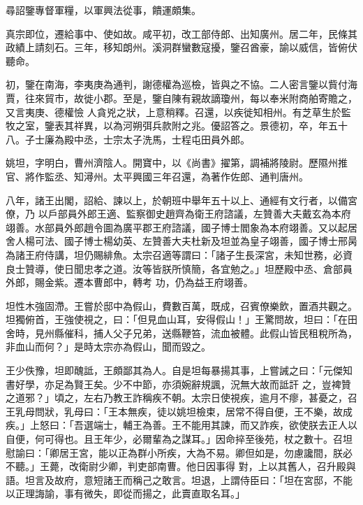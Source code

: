 \begin{pinyinscope}
 尋詔鑒專督軍糧，以軍興法從事，饋運頗集。



 真宗即位，遷給事中、使如故。咸平初，改工部侍郎、出知廣州。居二年，民條其政績上請刻石。三年，移知朗州。溪洞群蠻數寇擾，鑒召酋豪，諭以威信，皆俯伏聽命。



 初，鑒在南海，李夷庚為通判，謝德權為巡檢，皆與之不協。二人密言鑒以貲付海賈，往來貿市，故徙小郡。至是，鑒自陳有親故謫瓊州，每以奉米附商舶寄贍之，又言夷庚、德權憸
 人貪兇之狀，上意稍釋。召還，以疾徙知相州。有芝草生於監牧之室，鑒表其祥異，以為河朔弭兵款附之兆。優詔答之。景德初，卒，年五十八。子士廉為殿中丞，士宗太子洗馬，士程屯田員外郎。



 姚坦，字明白，曹州濟陰人。開寶中，以《尚書》擢第，調補將陵尉。歷隰州推官、將作監丞、知潯州。太平興國三年召還，為著作佐郎、通判唐州。



 八年，諸王出閣，詔給、諫以上，於朝班中舉年五十以上、通經有文行者，以備宮僚，乃
 以戶部員外郎王適、監察御史趙齊為衛王府諮議，左贊善大夫戴玄為本府翊善。水部員外郎趙令圖為廣平郡王府諮議，國子博士閻象為本府翊善。又以起居舍人楊可法、國子博士楊幼英、左贊善大夫杜新及坦並為皇子翊善，國子博士邢昺為諸王府侍講，坦仍賜緋魚。太宗召適等謂曰：「諸子生長深宮，未知世務，必資良士贊導，使日聞忠孝之道。汝等皆朕所慎簡，各宜勉之。」坦歷殿中丞、倉部員外郎，賜金紫。遷本曹郎中，轉考
 功，仍為益王府翊善。



 坦性木強固滯。王嘗於邸中為假山，費數百萬，既成，召賓僚樂飲，置酒共觀之。坦獨俯首，王強使視之，曰：「但見血山耳，安得假山！」王驚問故，坦曰：「在田舍時，見州縣催科，捕人父子兄弟，送縣鞭笞，流血被體。此假山皆民租稅所為，非血山而何？」是時太宗亦為假山，聞而毀之。



 王少佚豫，坦即醜詆，王頗鄙其為人。自是坦每暴揚其事，上嘗誡之曰：「元傑知書好學，亦足為賢王矣。少不中節，亦須婉辭規諷，況無大故而詆訐
 之，豈裨贊之道邪？」頃之，左右乃教王詐稱疾不朝。太宗日使視疾，逾月不瘳，甚憂之，召王乳母問狀，乳母曰：「王本無疾，徒以姚坦檢束，居常不得自便，王不樂，故成疾。」上怒曰：「吾選端士，輔王為善。王不能用其諫，而又詐疾，欲使朕去正人以自便，何可得也。且王年少，必爾輩為之謀耳。」因命捽至後苑，杖之數十。召坦慰諭曰：「卿居王宮，能以正為群小所疾，大為不易。卿但如是，勿慮讒間，朕必不聽。」王薨，改衛尉少卿，判吏部南曹。他日因事得
 對，上以其舊人，召升殿與語。坦言及故府，意短諸王而稱己之敢言。坦退，上謂侍臣曰：「坦在宮邸，不能以正理誨諭，事有微失，即從而揚之，此賣直取名耳。」




\end{pinyinscope}
